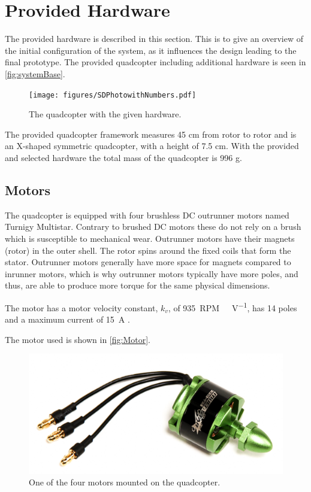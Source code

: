 \section{Provided Hardware}\label{sec:hardware}
The provided hardware is described in this section. This is to give an overview of the initial configuration of the system, as it influences the design leading to the final prototype. The provided quadcopter including additional hardware is seen in \autoref{fig:systemBase}.
%
\begin{figure}[H]
  \centering
  \texttt{[image: figures/SDPhotowithNumbers.pdf]}
  \caption{The quadcopter with the given hardware.}
  \label{fig:systemBase}
\end{figure}
%
The provided quadcopter framework measures 45 cm from rotor to rotor and is an X-shaped symmetric quadcopter, with a height of 7.5 cm. With the provided and selected hardware the total mass of the quadcopter is 996 g.

\subsection{Motors}
The quadcopter is equipped with four brushless DC outrunner motors named Turnigy Multistar. Contrary to brushed DC motors these do not rely on a brush which is susceptible to mechanical wear. Outrunner motors have their magnets (rotor) in the outer shell. The rotor spins around the fixed coils that form the stator. Outrunner motors generally have more space for magnets compared to inrunner motors, which is why outrunner motors typically have more poles, and thus, are able to produce more torque for the same physical dimensions. 

The motor has a motor velocity constant, $k_v$, of \SI{935}{RPM\ V^{-1}}, has 14 poles and a maximum current of \SI{15}{A} \cite{HkingPropeller}.

The motor used is shown in \autoref{fig:Motor}.
\begin{figure}[H]
	\centering
	\includegraphics[scale=0.5]{figures/motorphoto.png}
	\caption{One of the four motors mounted on the quadcopter.\cite{HkingPropeller}}
	\label{fig:Motor}
\end{figure} 

